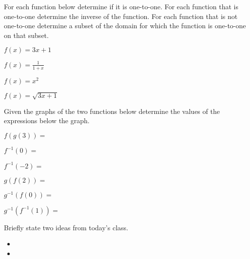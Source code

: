 \begin{problem}
\item For each function below determine if it is one-to-one. For each
  function that is one-to-one determine the inverse of the
  function. For each function that is not one-to-one determine a
  subset of the domain for which the function is one-to-one on that
  subset. 
  \begin{subproblem}
    \item $f(x)=3x+1$
      \vfill
    \item $f(x)=\frac{1}{1+x}$
      \vfill
    \item $f(x)=x^2$
      \vfill
    \item $f(x)=\sqrt{3x+1}$
      \vfill
  \end{subproblem}

  \clearpage

\item Given the graphs of the two functions below determine the values
  of the expressions below the graph.

  \hspace*{-6em}
  \scalebox{0.95}{}

  \begin{subproblem}
    \item $f(g(3)) =$
      \vfill
    \item $f^{-1}(0) =$
      \vfill
    \item $f^{-1}(-2) = $
      \vfill
    \item $g(f(2)) = $
      \vfill
    \item $g^{-1}(f(0)) = $
      \vfill
    \item $g^{-1}(f^{-1}(1)) = $
      \vfill
  \end{subproblem}

\end{problem}

\postClass

\begin{problem}
\item Briefly state two ideas from today's class.
  \begin{itemize}
  \item 
  \item 
  \end{itemize}
\item 
  \begin{subproblem}
    \item
  \end{subproblem}
\end{problem}



